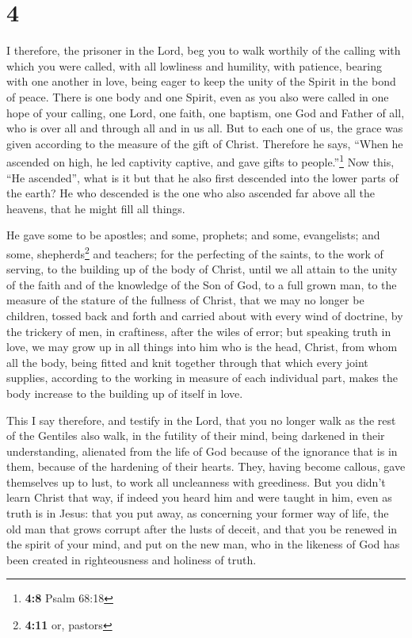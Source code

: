 \hypertarget{section-3}{%
\section{4}\label{section-3}}

 I therefore, the prisoner in the Lord, beg you to walk
worthily of the calling with which you were called,  with
all lowliness and humility, with patience, bearing with one another in
love,  being eager to keep the unity of the Spirit in the
bond of peace.  There is one body and one Spirit, even as
you also were called in one hope of your calling,  one
Lord, one faith, one baptism,  one God and Father of all,
who is over all and through all and in us all.  But to
each one of us, the grace was given according to the measure of the gift
of Christ.  Therefore he says, ``When he ascended on high,
he led captivity captive, and gave gifts to people.''\footnote{\textbf{4:8}
  Psalm 68:18}  Now this, ``He ascended'', what is it but
that he also first descended into the lower parts of the earth?
 He who descended is the one who also ascended far above
all the heavens, that he might fill all things.

 He gave some to be apostles; and some, prophets; and
some, evangelists; and some, shepherds\footnote{\textbf{4:11} or,
  pastors} and teachers;  for the perfecting of the
saints, to the work of serving, to the building up of the body of
Christ,  until we all attain to the unity of the faith
and of the knowledge of the Son of God, to a full grown man, to the
measure of the stature of the fullness of Christ,  that
we may no longer be children, tossed back and forth and carried about
with every wind of doctrine, by the trickery of men, in craftiness,
after the wiles of error;  but speaking truth in love, we
may grow up in all things into him who is the head, Christ,
 from whom all the body, being fitted and knit together
through that which every joint supplies, according to the working in
measure of each individual part, makes the body increase to the building
up of itself in love.

 This I say therefore, and testify in the Lord, that you
no longer walk as the rest of the Gentiles also walk, in the futility of
their mind,  being darkened in their understanding,
alienated from the life of God because of the ignorance that is in them,
because of the hardening of their hearts.  They, having
become callous, gave themselves up to lust, to work all uncleanness with
greediness.  But you didn't learn Christ that way,
 if indeed you heard him and were taught in him, even as
truth is in Jesus:  that you put away, as concerning your
former way of life, the old man that grows corrupt after the lusts of
deceit,  and that you be renewed in the spirit of your
mind,  and put on the new man, who in the likeness of God
has been created in righteousness and holiness of truth.

